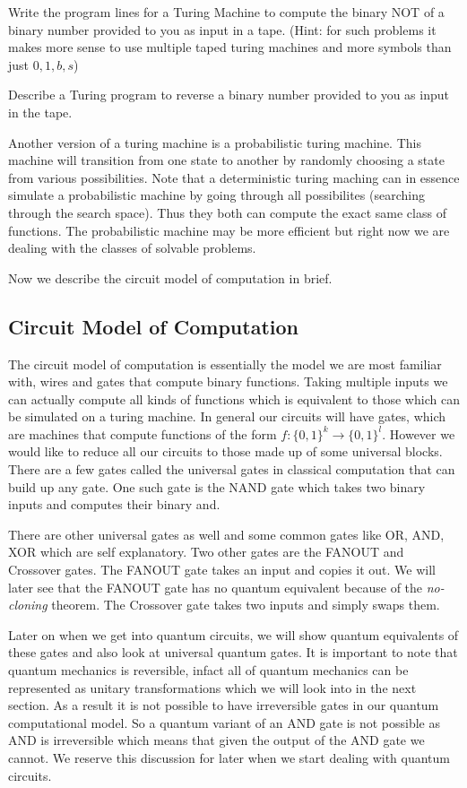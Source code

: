 \begin{exercise}
Write the program lines for a Turing Machine to compute the binary NOT of a binary number provided to you as input in a tape.
(Hint: for such problems it makes more sense to use multiple taped turing machines and more symbols than just $0, 1, b, s$)
\end{exercise}
\begin{exercise}
Describe a Turing program to reverse a binary number provided to you as input in the tape.
\end{exercise}
Another version of a turing machine is a probabilistic turing machine. This machine will transition from one state to another by randomly choosing a state from various possibilities. Note that a deterministic turing maching can in essence simulate a probabilistic machine by going through all possibilites (searching through the search space). Thus they both can compute the exact same class of functions. The probabilistic machine may be more efficient but right now we are dealing with the classes of solvable problems.

Now we describe the circuit model of computation in brief.
\clearpage

\subsection{Circuit Model of Computation}
The circuit model of computation is essentially the model we are most familiar with, wires and gates that compute binary functions. Taking multiple inputs we can actually compute all kinds of functions which is equivalent to those which can be simulated on a turing machine.  In general our circuits will have gates, which are machines that compute functions of the form $f : \{0, 1 \}^{k} \to \{0, 1\}^{l}$. However we would like to reduce all our circuits to those made up of some universal blocks. There are a few gates called the universal gates in classical computation that can build up any gate. One such gate is the NAND gate which takes two binary inputs and computes their binary and.

There are other universal gates as well and some common gates like OR, AND, XOR which are self explanatory. Two other gates are the FANOUT and Crossover gates. The FANOUT gate takes an input and copies it out. We will later see that the FANOUT gate has no quantum equivalent because of the \textit{no-cloning} theorem. The Crossover gate takes two inputs and simply swaps them.

Later on when we get into quantum circuits, we will show quantum equivalents of these gates and also look at universal quantum gates. It is important to note that quantum mechanics is reversible, infact all of quantum mechanics can be represented as unitary transformations which we will look into in the next section. As a result it is not possible to have irreversible gates in our quantum computational model. So a quantum variant of an AND gate is not possible as AND is irreversible which means that given the output of the AND gate we cannot. We reserve this discussion for later when we start dealing with quantum circuits.

